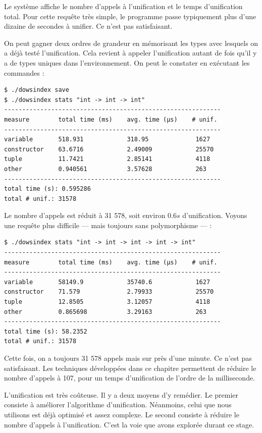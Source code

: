 \documentclass[a4paper]{report}
\theoremstyle{definition}
\begin{document}
Le système affiche le nombre d'appels à l'unification et le temps d'unification total. Pour cette requête très simple, le programme passe typiquement plus d'une dizaine de secondes à unifier. Ce n'est pas satisfaisant.

On peut gagner deux ordres de grandeur en mémorisant les types avec lesquels on a déjà testé l'unification. Cela revient à appeler l'unification autant de fois qu'il y a de types uniques dans l'environnement. On peut le constater en exécutant les commandes :

\begin{verbatim}
$ ./dowsindex save
$ ./dowsindex stats "int -> int -> int"
------------------------------------------------------------
measure        total time (ms)    avg. time (µs)    # unif.
------------------------------------------------------------
variable       518.931            318.95             1627
constructor    63.6716            2.49009            25570
tuple          11.7421            2.85141            4118
other          0.940561           3.57628            263
------------------------------------------------------------
total time (s): 0.595286
total # unif.: 31578
\end{verbatim}

Le nombre d'appels est réduit à 31 578, soit environ $0.6s$ d'unification. Voyons une requête plus difficile — mais toujours sans polymorphisme — :

\begin{verbatim}
$ ./dowsindex stats "int -> int -> int -> int -> int"
------------------------------------------------------------
measure        total time (ms)    avg. time (µs)    # unif.
------------------------------------------------------------
variable       58149.9            35740.6            1627
constructor    71.579             2.79933            25570
tuple          12.8505            3.12057            4118
other          0.865698           3.29163            263
------------------------------------------------------------
total time (s): 58.2352
total # unif.: 31578
\end{verbatim}

Cette fois, on a toujours 31 578 appels mais sur près d'une minute. Ce n'est pas satisfaisant. Les techniques développées dans ce chapitre permettent de réduire le nombre d'appels à 107, pour un temps d'unification de l'ordre de la milliseconde.

L'unification est très coûteuse. Il y a deux moyens d'y remédier. Le premier consiste à améliorer l'algorithme d'unification. Néanmoins, celui que nous utilisons est déjà optimisé et assez complexe. Le second consiste à réduire le nombre d'appels à l'unification. C'est la voie que avons explorée durant ce stage.
\end{document}
